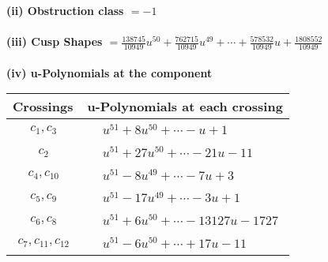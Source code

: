 \documentclass[1p]{elsarticle_modified}
\theoremstyle{definition}
\begin{document}
\flushleft \textbf{(ii) Obstruction class $= -1$}\\~\\
\flushleft \textbf{(iii) Cusp Shapes $= \frac{138745}{10949} u^{50}+\frac{762715}{10949} u^{49}+\cdots+\frac{578532}{10949} u+\frac{1808552}{10949}$}\\~\\
\newpage\renewcommand{\arraystretch}{1}
\flushleft \textbf{(iv) u-Polynomials at the component}\newline \\
\begin{tabular}{m{50pt}|m{274pt}}
Crossings & \hspace{64pt}u-Polynomials at each crossing \\
\hline $$\begin{aligned}c_{1},c_{3}\end{aligned}$$&$\begin{aligned}
&u^{51}+8 u^{50}+\cdots- u+1
\end{aligned}$\\
\hline $$\begin{aligned}c_{2}\end{aligned}$$&$\begin{aligned}
&u^{51}+27 u^{50}+\cdots-21 u-11
\end{aligned}$\\
\hline $$\begin{aligned}c_{4},c_{10}\end{aligned}$$&$\begin{aligned}
&u^{51}-8 u^{49}+\cdots-7 u+3
\end{aligned}$\\
\hline $$\begin{aligned}c_{5},c_{9}\end{aligned}$$&$\begin{aligned}
&u^{51}-17 u^{49}+\cdots-3 u+1
\end{aligned}$\\
\hline $$\begin{aligned}c_{6},c_{8}\end{aligned}$$&$\begin{aligned}
&u^{51}+6 u^{50}+\cdots-13127 u-1727
\end{aligned}$\\
\hline $$\begin{aligned}c_{7},c_{11},c_{12}\end{aligned}$$&$\begin{aligned}
&u^{51}-6 u^{50}+\cdots+17 u-11
\end{aligned}$\\
\hline
\end{tabular}\\~\\
\end{document}
